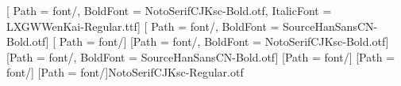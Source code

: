 
[    %
    Path = font/,
    BoldFont = NotoSerifCJKsc-Bold.otf,         %
    ItalicFont = LXGWWenKai-Regular.ttf]        %
[   %
    Path = font/,
    BoldFont = SourceHanSansCN-Bold.otf]
[    %
    Path = font/]
[Path = font/, BoldFont = NotoSerifCJKsc-Bold.otf]
[Path = font/, BoldFont = SourceHanSansCN-Bold.otf]
[Path = font/]
[Path = font/]
\providecommand\songti{}\renewcommand\songti{\CJKfamily{cnsong}}
\providecommand\heiti{}\renewcommand\heiti{\CJKfamily{cnhei}}
\providecommand\fangsong{}\renewcommand\fangsong{\CJKfamily{cnfs}}
\providecommand\kaishu{}\renewcommand\kaishu{\CJKfamily{cnkai}}
\xeCJKenablefallback
{}[Path = font/]{NotoSerifCJKsc-Regular.otf}


